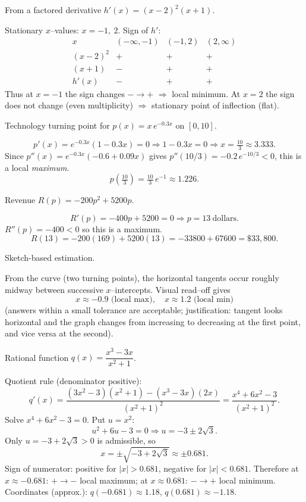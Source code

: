 \documentclass[11pt]{article}
\def\textbf#1{#1}%
\begin{document}
\begin{solution}
\textbf{From a factored derivative $h'(x)=(x-2)^{2}(x+1)$.}

Stationary $x$–values: $\boxed{x=-1,\ 2}$.  
Sign of $h'$:
\[
\begin{array}{c|cccc}
x & (-\infty,-1) & (-1,2) & (2,\infty)\\\hline
(x-2)^{2} & + & + & +\\
(x+1) & - & + & +\\
h'(x) & - & + & +
\end{array}
\]
Thus at $x=-1$ the sign changes $-\to +$ $\Rightarrow$ \textbf{local minimum}.  
At $x=2$ the sign does not change (even multiplicity) $\Rightarrow$ \textbf{stationary point of inflection} (flat).
\end{solution}

\begin{solution}
\textbf{Technology turning point for $p(x)=x\,e^{-0.3x}$ on $[0,10]$.}

\[
p'(x)=e^{-0.3x}(1-0.3x)=0 \Rightarrow 1-0.3x=0 \Rightarrow x=\boxed{\tfrac{10}{3}\approx 3.333}.
\]
Since $p''(x)=e^{-0.3x}(-0.6+0.09x)$ gives $p''(10/3)=-0.2\,e^{-10/3}<0$, this is a local \emph{maximum}.  
\[
p\!\left(\tfrac{10}{3}\right)=\tfrac{10}{3}\,e^{-1}\approx \boxed{1.226}.
\]
\end{solution}

\begin{solution}
\textbf{Revenue $R(p)=-200p^{2}+5200p$.}

\[
R'(p)=-400p+5200=0 \Rightarrow p=\boxed{13\ \text{dollars}}.
\]
$R''(p)=-400<0$ so this is a maximum.  
\[
R(13)=-200(169)+5200(13)=-33800+67600=\boxed{\$33{,}800}.
\]
\end{solution}

\begin{solution}
\textbf{Sketch-based estimation.}

From the curve (two turning points), the horizontal tangents occur roughly midway between successive $x$–intercepts. Visual read–off gives
\[
\boxed{x\approx -0.9 \text{ (local max)},\quad x\approx 1.2 \text{ (local min)}}
\]
(answers within a small tolerance are acceptable; justification: tangent looks horizontal and the graph changes from increasing to decreasing at the first point, and vice versa at the second).
\end{solution}

\begin{solution}
\textbf{Rational function $q(x)=\dfrac{x^{3}-3x}{x^{2}+1}$.}

Quotient rule (denominator positive):
\[
q'(x)=\frac{(3x^{2}-3)(x^{2}+1)-(x^{3}-3x)(2x)}{(x^{2}+1)^{2}}
=\frac{x^{4}+6x^{2}-3}{(x^{2}+1)^{2}}.
\]
Solve $x^{4}+6x^{2}-3=0$. Put $u=x^{2}$:
\[
u^{2}+6u-3=0 \Rightarrow u=-3\pm2\sqrt3.
\]
Only $u=-3+2\sqrt3>0$ is admissible, so
\[
x=\boxed{\pm\sqrt{-3+2\sqrt3}}\approx \boxed{\pm0.681}.
\]
Sign of numerator: positive for $|x|>0.681$, negative for $|x|<0.681$.  
Therefore at $x\approx -0.681$: $+\to-$ \textbf{local maximum};  
at $x\approx 0.681$: $-\to+$ \textbf{local minimum}.  
Coordinates (approx.): $q(-0.681)\approx \boxed{1.18}$, $q(0.681)\approx \boxed{-1.18}$.
\end{solution}
\end{document}

